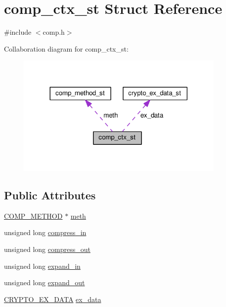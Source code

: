 \hypertarget{structcomp__ctx__st}{}\section{comp\+\_\+ctx\+\_\+st Struct Reference}
\label{structcomp__ctx__st}


{\ttfamily \#include $<$comp.\+h$>$}



Collaboration diagram for comp\+\_\+ctx\+\_\+st\+:
\nopagebreak
\begin{figure}[H]
\begin{center}
\leavevmode
\includegraphics[width=288pt]{structcomp__ctx__st__coll__graph}
\end{center}
\end{figure}
\subsection*{Public Attributes}
\begin{DoxyCompactItemize}
\item 
\hyperlink{comp_8h_accb14d1335a2b0001abce2642d45f353}{C\+O\+M\+P\+\_\+\+M\+E\+T\+H\+OD} $\ast$ \hyperlink{structcomp__ctx__st_accd49b9ff8bafe3fa01c8cadc597b855}{meth}
\item 
unsigned long \hyperlink{structcomp__ctx__st_a4a67c3eda213508177bedaaae237f8c4}{compress\+\_\+in}
\item 
unsigned long \hyperlink{structcomp__ctx__st_a4ad823d6c60afbb5d0951f97b3f2e787}{compress\+\_\+out}
\item 
unsigned long \hyperlink{structcomp__ctx__st_a14c4bacc851d14791e566f11624f9a8e}{expand\+\_\+in}
\item 
unsigned long \hyperlink{structcomp__ctx__st_acddf6014a55ffef5a232046f63d4f8a6}{expand\+\_\+out}
\item 
\hyperlink{ossl__typ_8h_a7eaff1c18057495d8af18f22d1370b51}{C\+R\+Y\+P\+T\+O\+\_\+\+E\+X\+\_\+\+D\+A\+TA} \hyperlink{structcomp__ctx__st_ab5069d63997ca03596aeadb5f03f37ec}{ex\+\_\+data}
\end{DoxyCompactItemize}


